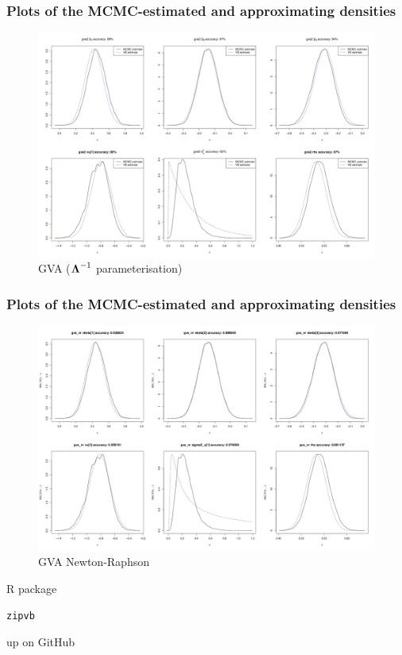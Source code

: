 \documentclass{beamer}
\begin{document}
\begin{frame}
	\frametitle{Plots of the MCMC-estimated and approximating densities}
	\begin{figure}
		\caption{GVA (${\boldsymbol \Lambda}^{-1}$ parameterisation)}
		\includegraphics[scale=0.15]{code/results/output_montage_application_gva2.png}
	\end{figure}
\end{frame}

\begin{frame}
	\frametitle{Plots of the MCMC-estimated and approximating densities}
	\begin{figure}
		\caption{GVA Newton-Raphson}
		\includegraphics[scale=0.15]{code/results/output_montage_application_gva_nr.png}
	\end{figure}
\end{frame}

\begin{frame}{R package}
	
	\texttt{zipvb}
	
	up on GitHub
	
\end{frame}
\end{document}
